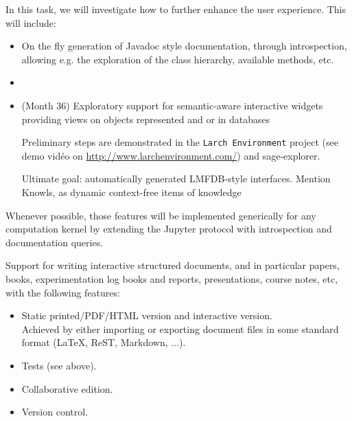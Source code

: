 \begin{workpackage}
\begin{tasklist}
\begin{task}[title=Dynamic documentation and exploration system]
  In this task, we will investigate how to further enhance the user
  experience. This will include:

  \begin{itemize}
  \item On the fly generation of Javadoc style documentation, through
    introspection, allowing e.g. the exploration of the class
    hierarchy, available methods, etc.
  \item {}
  \item {} (Month 36) Exploratory
    support for semantic-aware interactive widgets providing views on
    objects represented and or in databases

    Preliminary steps are demonstrated in the \texttt{Larch
      Environment} project (see demo vidéo on
    \url{http://www.larchenvironment.com/}) and sage-explorer.

    Ultimate goal: automatically generated LMFDB-style interfaces.
    Mention Knowls, as dynamic context-free items of knowledge
  \end{itemize}




  Whenever possible, those features will be implemented generically
  for any computation kernel by extending the Jupyter protocol with
  introspection and documentation queries.

\end{task}

\begin{task}[title=Structured documents]
  Support for writing interactive structured documents, and in
  particular papers, books, experimentation log books and reports,
  presentations, course notes, etc, with the following features:
  \begin{itemize}
  \item Static printed/PDF/HTML version and interactive version.\\
    Achieved by either importing or exporting document files in some
    standard format (LaTeX, ReST, Markdown, ...).
  \item Tests (see above).
  \item Collaborative edition.
  \item Version control.
  \end{itemize}
\end{task}


\end{tasklist}
\end{workpackage}
